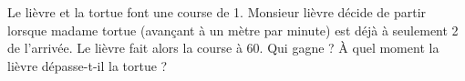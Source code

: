 
\begin{exercice}\label{exosmath-0493}

    Le lièvre et la tortue font une course de \unit{1}{\kilo\meter}. Monsieur lièvre décide de partir lorsque madame tortue (avançant à un mètre par minute) est déjà à seulement \unit{2}{\meter} de l'arrivée. Le lièvre fait alors la course à \unit{60}{\kilo\meter\per\hour}. Qui gagne ? À quel moment la lièvre dépasse-t-il la tortue ?

\end{exercice}
